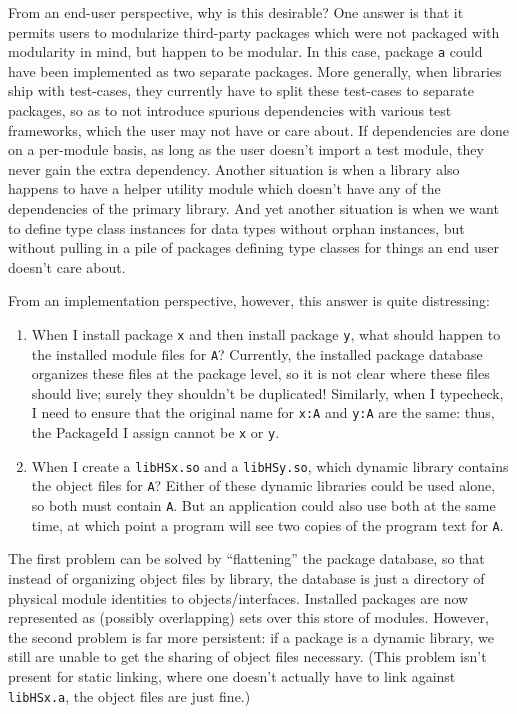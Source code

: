 \documentclass{article}
\begin{document}
From an end-user perspective, why is this desirable?  One answer is that
it permits users to modularize third-party packages which were not
packaged with modularity in mind, but happen to be modular.  In this
case, package \verb|a| could have been implemented as two separate
packages. More generally, when libraries ship with test-cases, they currently have to
split these test-cases to separate packages, so as to not introduce
spurious dependencies with various test frameworks, which the user may
not have or care about.  If dependencies are done on a per-module basis,
as long as the user doesn't import a test module, they never gain the
extra dependency.  Another situation is when a library also happens to
have a helper utility module which doesn't have any of the dependencies
of the primary library.  And yet another situation is when we want to
define type class instances for data types without orphan instances, but
without pulling in a pile of packages defining type classes for things
an end user doesn't care about.

From an implementation perspective, however, this answer is quite distressing:

\begin{enumerate}
    \item When I install package \verb|x| and then install package
        \verb|y|, what should happen to the installed module files for
        \verb|A|?  Currently, the installed package database organizes
        these files at the package level, so it is not clear where these
        files should live; surely they shouldn't be duplicated!
        Similarly, when I typecheck, I need to ensure that the original
        name for \verb|x:A| and \verb|y:A| are the same: thus, the
        PackageId I assign cannot be \verb|x| or \verb|y|.

    \item When I create a \verb|libHSx.so| and a \verb|libHSy.so|, which
        dynamic library contains the object files for \verb|A|?  Either
        of these dynamic libraries could be used alone, so both must
        contain \verb|A|. But an application could also use both at the
        same time, at which point a program will see two copies of the
        program text for \verb|A|.
\end{enumerate}

The first problem can be solved by ``flattening'' the package database,
so that instead of organizing object files by library, the database
is just a directory of physical module identities to objects/interfaces.
Installed packages are now represented as (possibly overlapping) sets over
this store of modules.  However, the second problem is far more persistent:
if a package is a dynamic library, we still are unable to get the sharing of
object files necessary. (This problem isn't present for static linking, where
one doesn't actually have to link against \verb|libHSx.a|, the object files
are just fine.)
\end{document}
